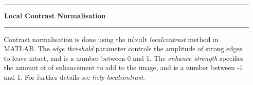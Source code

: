\noindent\rule{\textwidth}{1pt}
\indent \textbf{Local Contrast Normalisation}
\noindent\rule{\textwidth}{1pt}
\smallskip
\parbox{\textwidth}{Contrast normalisation is done using the inbuilt \textit{localcontrast} method in MATLAB. The \textit{edge threshold} parameter controls the amplitude of strong edges to leave intact, and is a number between 0 and 1. The \textit{enhance strength} specifies the amount of of enhancement to add to the image, and is a number between -1 and 1. For further details see \textit{help localcontrast}.}
\smallskip

